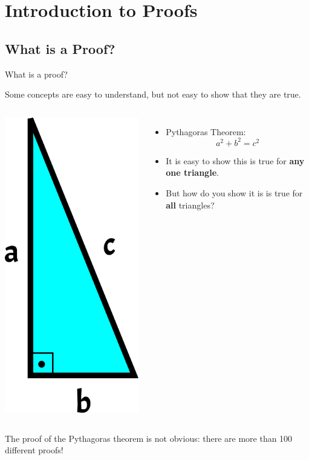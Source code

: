 \section{Introduction to Proofs}


\subsection{What is a Proof?}

\begin{frame}{What is a proof?}

  Some concepts are easy to understand, but not easy to show that they are true.\bigskip

  \begin{columns}
      \centering
      \includegraphics[width=.5\textwidth]{../img/triangle_rect}
      \begin{itemize}
        \item Pythagoras Theorem:
        \begin{equation*}
          a^2+b^2=c^2
        \end{equation*}
        \item It is easy to show this is true for {\bf any one triangle}.
        \item But how do you show it is is true for {\bf all} triangles?
      \end{itemize}
  \end{columns}
  \bigskip

  The proof of the Pythagoras theorem is {not obvious}: there are more than 100 different proofs!
\end{frame}

